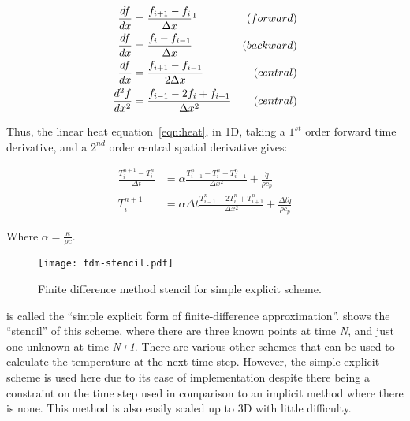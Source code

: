 
\begin{subequations}
\begin{align}
\frac{df}{dx} &= \frac{f_{i+1} - f_{i}}{\Delta x}\footnotemark  &(forward) \label{eqn:fdmfwd}\\
\frac{df}{dx} &= \frac{f_{i} - f_{i-1}}{\Delta x}  &(backward) \label{eqn:fdmbck}\\
\frac{df}{dx} &= \frac{f_{i+1} - f_{i-1}}{2\Delta x}  &(central)\label{eqn:fdmcent}\\
\frac{d^2f}{dx^2} &= \frac{f_{i-1}-2f_i+f_{i+1}}{\Delta x^2} &(central)\label{eqn:fdmcent2}
\end{align}
\end{subequations}

Thus, the linear heat equation~\cref{eqn:heat}, in 1D, taking a $1^{st}$ order forward time derivative, and a $2^{nd}$ order central spatial derivative gives:

\begin{subequations}
\begin{align}
\frac{T^{n+1}_i-T^{n}_i}{\Delta t} &= \alpha\frac{T^n_{i-1}-T^n_{i}+T^n_{i+1}}{\Delta x^2}  + \frac{\dot{q}}{\rho c_p}\\
T_{i}^{n+1} &=  \alpha\Delta t \frac{T_{i-1}^n-2T_i^n+T_{i+1}^n}{\Delta x^2} + \frac{\Delta t\dot{q}}{\rho c_p}
\label{eqn:simplefdm}
\end{align}
\end{subequations}

Where $\alpha=\tfrac{\kappa}{\rho c}$.

\begin{figure}
  \begin{center}
    \texttt{[image: fdm-stencil.pdf]}
  \end{center}
  \caption{Finite difference method stencil for simple explicit scheme.}
  \label{fig:fdmstencil}
\end{figure}

 is called the ``simple explicit form of finite-difference approximation''\cite{ozisik1994finite}.  shows the ``stencil'' of this scheme, where there are three known points at time \textit{N}, and just one unknown at time \textit{N+1}. There are various other schemes that can be used to calculate the temperature at the next time step. However, the simple explicit scheme is used here due to its ease of implementation despite there being a constraint on the time step used in comparison to an implicit method where there is none. This method is also easily scaled up to 3D with little difficulty.

